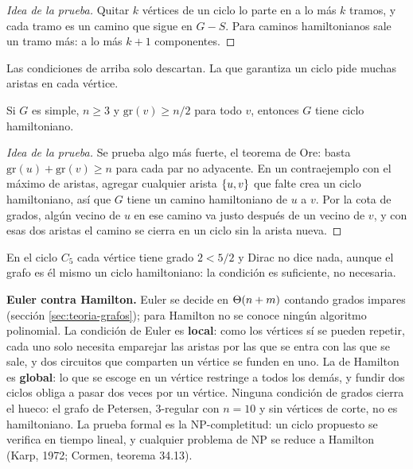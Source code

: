 \documentclass[11pt,letterpaper]{article}
\begin{document}
\begin{proof}[Idea de la prueba]
  Quitar $k$ vértices de un ciclo lo parte en a lo más $k$ tramos, y
  cada tramo es un camino que sigue en $G - S$. Para caminos
  hamiltonianos sale un tramo más: a lo más $k + 1$ componentes.
\end{proof}

Las condiciones de arriba solo descartan. La que garantiza un ciclo
pide muchas aristas en cada vértice.

\begin{teorema}[Dirac, 1952]
  \label{teo:hamilton-dirac}
  Si $G$ es simple, $n \ge 3$ y $\text{gr}(v) \ge n/2$ para todo
  $v$, entonces $G$ tiene ciclo hamiltoniano.
\end{teorema}

\begin{proof}[Idea de la prueba]
  Se prueba algo más fuerte, el teorema de Ore: basta
  $\text{gr}(u) + \text{gr}(v) \ge n$ para cada par no adyacente. En un
  contraejemplo con el máximo de aristas, agregar cualquier arista
  $\left\{ u, v \right\}$ que falte crea un ciclo hamiltoniano, así que $G$ tiene
  un camino hamiltoniano de $u$ a $v$. Por la cota de grados, algún
  vecino de $u$ en ese camino va justo después de un vecino de $v$, y
  con esas dos aristas el camino se cierra en un ciclo sin la arista
  nueva.
\end{proof}

En el ciclo $C_5$ cada vértice tiene grado $2 < 5/2$ y Dirac no dice
nada, aunque el grafo es él mismo un ciclo hamiltoniano: la condición
es suficiente, no necesaria.

\textbf{Euler contra Hamilton.} Euler se decide en $\Theta\!\left(n + m\right)$
contando grados impares (sección \ref{sec:teoria-grafos}); para
Hamilton no se conoce ningún algoritmo polinomial. La condición de
Euler es \textbf{local}: como los vértices sí se pueden repetir, cada
uno solo necesita emparejar las aristas por las que se entra con las
que se sale, y dos circuitos que comparten un vértice se funden en
uno. La de Hamilton es
\textbf{global}: lo que se escoge en un vértice restringe a todos los
demás, y fundir dos ciclos obliga a pasar dos veces por un vértice.
Ninguna condición de grados cierra el hueco: el grafo de Petersen,
$3$-regular con $n = 10$ y sin vértices de corte, no es hamiltoniano.
La prueba formal es la NP-completitud: un ciclo propuesto se verifica
en tiempo lineal, y cualquier problema de NP se reduce a Hamilton
(Karp, 1972; Cormen, teorema 34.13).

\end{document}
